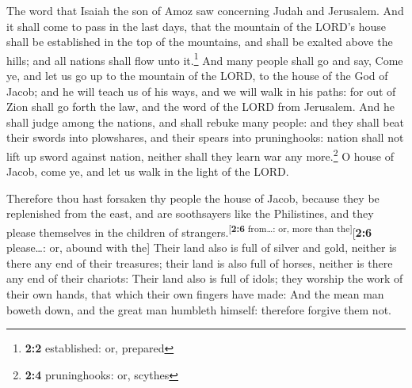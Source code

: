  The word that Isaiah the son of Amoz saw concerning Judah
and Jerusalem.  And it shall come to pass in the last
days, that the mountain of the LORD's house shall be established in the
top of the mountains, and shall be exalted above the hills; and all
nations shall flow unto it.\footnote{\textbf{2:2} established: or,
  prepared}  And many people shall go and say, Come ye,
and let us go up to the mountain of the LORD, to the house of the God of
Jacob; and he will teach us of his ways, and we will walk in his paths:
for out of Zion shall go forth the law, and the word of the LORD from
Jerusalem.  And he shall judge among the nations, and
shall rebuke many people: and they shall beat their swords into
plowshares, and their spears into pruninghooks: nation shall not lift up
sword against nation, neither shall they learn war any more.\footnote{\textbf{2:4}
  pruninghooks: or, scythes}  O house of Jacob, come ye,
and let us walk in the light of the LORD.

 Therefore thou hast forsaken thy people the house of
Jacob, because they be replenished from the east, and are soothsayers
like the Philistines, and they please themselves in the children of
strangers.\textsuperscript{{[}\textbf{2:6} from\ldots: or, more than
the{]}}{[}\textbf{2:6} please\ldots: or, abound with the{]}
 Their land also is full of silver and gold, neither is
there any end of their treasures; their land is also full of horses,
neither is there any end of their chariots:  Their land
also is full of idols; they worship the work of their own hands, that
which their own fingers have made:  And the mean man
boweth down, and the great man humbleth himself: therefore forgive them
not.

